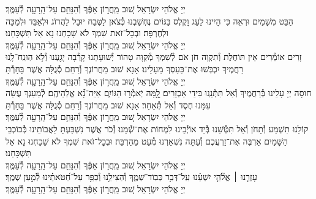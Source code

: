 \documentclass[twoside, openany, parskip=half, 11pt]{book}
\begin{document}
\nefilasapayim \label{nefilas_apayim}

\begin{sometimes}

\setlength{\LTpost}{0pt}

יְיָ אֱלֹהֵי יִשְׂרָאֵל  שׁ֚וּב מֵֽחֲר֣וֹן אַפֶּ֔ךָ וְ֯הִנָּחֵ֥ם עַל־הָֽרָעָ֖ה לְ֯עַמֶּֽךָ׃\\
הַבֵּט מִשָׁמַיִם וּרְאֵה כִּי הָיִינוּ לַעַג וָקֶלֶס בַּגּוֹיִם נֶחְשַׁבְנוּ כְּ֯צֹאן לַטֶּבַח יוּבָל לַהֲרוֹג וּלְאַבֵּד וּלְמַכָּה וּלְחֶרְפָּה׃ וּבְכׇל־זֹאת שִׁמְךָ לֹא שָׁכָחְנוּ נָא אַל תִּשְׁכָּחֵנוּ׃\\
יְיָ אֱלֹהֵי יִשְׂרָאֵל שׁ֚וּב מֵֽחֲר֣וֹן אַפֶּ֔ךָ וְ֯הִנָּחֵ֥ם עַל־הָֽרָעָ֖ה לְ֯עַמֶּֽךָ׃\\
זָרִים אוֹמְ֯רִים אֵין תּוֹחֶלֶת וְ֯תִקְוָה חֹן אֹם לְ֯שִׁמְךָ מְ֯קַוָּה טָהוֹר יְ֯שׁוּעָתֵנוּ קָרְ֯בָה יָגַ֖עְנוּ וְ֯לֹ֥א הֽוּנַֽח־לָֽנוּ רַחֲמֶיךָ יִכְבְּשׁוּ אֶת־כַּעַסְךָ מֵעָלֵינוּ׃ אָנָא שׁוּב מֵחֲרוֹנְךָ וְ֯רַחֵם סְ֯גֻלָּה אֲשֶׁר בָּחָרְ֯תָּ\\
יְיָ אֱלֹהֵי יִשְׂרָאֵל שׁ֚וּב מֵֽחֲר֣וֹן אַפֶּ֔ךָ וְ֯הִנָּחֵ֥ם עַל־הָֽרָעָ֖ה לְ֯עַמֶּֽךָ׃\\
חוּסָה יְיָ עָלֵינוּ בְּ֯רַחֲמֶיךָ וְ֯אַל תִּתְּ֯נֵֽנוּ בִּידֵי אַכְזָרִים׃
לׇׇ֭מָּה יֹֽאמְ֯ר֣וּ הַגּוֹיִ֑ם אַיֵּה־נָ֝֗א אֱלֹֽהֵיהֶֽם׃
לְ֯מַעַנְךָ עֲשֵׂה עִמָּנוּ חֶסֶד וְ֯אַל תְּ֯אַחַר׃
אָנָא שׁוּב מֵחֲרוֹנְךָ וְ֯רַחֵם סְ֯גֻלָּה אֲשֶׁר בָּחָרְ֯תָּ\\
יְיָ אֱלֹהֵי יִשְׂרָאֵל שׁ֚וּב מֵֽחֲר֣וֹן אַפֶּ֔ךָ וְ֯הִנָּחֵ֥ם עַל־הָֽרָעָ֖ה לְ֯עַמֶּֽךָ׃\\
קוֹלֵנוּ תִשְׁמַע וְ֯תָחֹן וְ֯אַל תִּטְּ֯שֵׁנוּ בְּ֯יַד אוֹיְ֯בֵינוּ לִמְחוֹת אֶת־שְׁ֯מֵנוּ׃
זְ֯כֹר אֲשֶׁר נִשְׁבַּעְתָּ לַאֲבוֹתֵינוּ כְּ֯כוֹכְבֵי הַשָּׁמַיִם אַרְבֶּה אֶת־זַרְעֲכֶם וְ֯עַתָּה נִשְׁאַרְנוּ מְ֯עַט מֵהַרְבֵּה׃
וּבְכׇל־זֹאת שִׁמְךָ לֹא שָׁכָחְנוּ נָא אַל תִּשְׁכָּחֵנוּ׃\\
יְיָ אֱלֹהֵי יִשְׂרָאֵל שׁ֚וּב מֵֽחֲר֣וֹן אַפֶּ֔ךָ וְ֯הִנָּחֵ֥ם עַל־הָֽרָעָ֖ה לְ֯עַמֶּֽךָ׃\\
עׇזְרֵ֤נוּ ׀ אֱלֹ֘הֵ֤י יִשְׁעֵ֗נוּ עַֽל־דְּבַ֥ר כְּבֽוֹד־שְׁמֶ֑ךָ וְ֯הַצִּילֵ֥נוּ וְ֯כַפֵּ֥ר עַל־חַ֝טֹּאתֵ֗ינוּ לְ֯מַ֣עַן שְׁמֶֽךָ׃\\
יְיָ אֱלֹהֵי יִשְׂרָאֵל שׁ֚וּב מֵֽחֲר֣וֹן אַפֶּ֔ךָ וְ֯הִנָּחֵ֥ם עַל־הָֽרָעָ֖ה לְ֯עַמֶּֽךָ׃\\


\end{sometimes}
\end{document}
